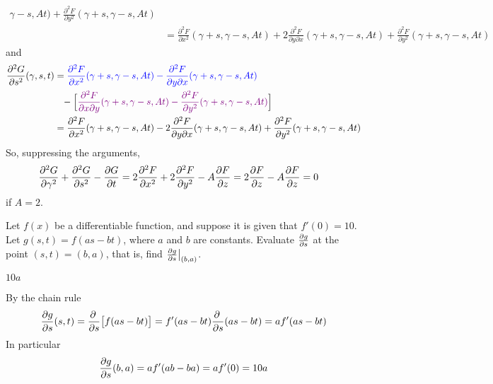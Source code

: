 \begin{solution}
\begin{align*}
{                                                               \gamma-s, At)
  +\frac{\partial^2 F}{\partial y^2}(\gamma + s, \gamma-s,  At)} \\
  &= \frac{\partial^2 F}{\partial x^2}(\gamma + s, \gamma-s, At)
    +2\frac{\partial^2 F}{\partial y\partial x}(\gamma + s, \gamma-s, At)
    +\frac{\partial^2 F}{\partial y^2}(\gamma + s, \gamma-s, At) 
\end{align*}
and
\begin{align*}
\frac{\partial^2G}{\partial s^2}(\gamma,s,t) 
&= \textcolor{blue}{\frac{\partial^2 F}{\partial x^2}(\gamma + s, \gamma-s, At)
   -\frac{\partial^2 F}{\partial y\partial x}(\gamma + s, \gamma-s, At)} \\
                 &\phantom{=}-\Big[ 
  \textcolor{violet}{\frac{\partial^2 F}{\partial x\partial y}(\gamma + s, 
                                                              \gamma-s, At)
         -\frac{\partial^2 F}{\partial y^2}(\gamma + s, \gamma-s, At)}\Big] \\
  &= \frac{\partial^2 F}{\partial x^2}(\gamma + s, \gamma-s, At)
    -2\frac{\partial^2 F}{\partial y\partial x}(\gamma + s, \gamma-s, At)
    +\frac{\partial^2 F}{\partial y^2}(\gamma + s, \gamma-s, At) 
\end{align*}
So, suppressing the arguments,
\begin{align*}
\frac{\partial^2 G}{\partial \gamma^2}
+ \frac{\partial^2 G}{\partial s^2}
-\frac{\partial G}{\partial t}
&=2\frac{\partial^2 F}{\partial x^2} + 2\frac{\partial^2 F}{\partial y^2}
  -A \pdiff{F}{z}
=2\pdiff{F}{z}-A \pdiff{F}{z}
=0
\end{align*}
if $A=2$.
\end{solution}

\begin{question}[M200 2013D] %
Let $f(x)$ be a differentiable function, and suppose it is given that 
$f'(0) = 10$.
Let $g(s,t) = f (as - bt)$, where $a$ and $b$ are constants. Evaluate 
$\pdiff{g}{s}$ at the point $(s,t) = (b,a)$, that is, find 
$\pdiff{g}{s}\big|_{(b,a)}$.
\end{question}

%

\begin{answer}
$10a$
\end{answer}

\begin{solution}
By the chain rule
\begin{align*}
\pdiff{g}{s}(s,t) = \pdiff{}{s}\big[f(as-bt)\big] 
                  =f'(as-bt)\pdiff{}{s}(as-bt)
                  = af'(as-bt)
\end{align*}
In particular
\begin{align*}
\pdiff{g}{s}(b,a) = af'(ab-ba) =af'(0) =10 a 
\end{align*}
\end{solution}

